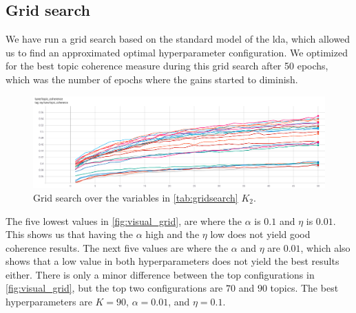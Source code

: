 \subsection{Grid search}
We have run a grid search based on the standard model of the \gls{lda}, which allowed us to find an approximated optimal hyperparameter configuration.
We optimized for the best topic coherence measure during this grid search after 50 epochs, which was the number of epochs where the gains started to diminish.
\begin{figure}
	\includegraphics[width=\textwidth]{figures/gridsearch.png}
	\caption{Grid search over the variables in \autoref{tab:gridsearch} $K_2$.}
	\label{fig:visual_grid}
\end{figure} 
The five lowest values in \autoref{fig:visual_grid}, are where the $\alpha$ is $0.1$ and $\eta$ is $0.01$. 
This shows us that having the $\alpha$ high and the $\eta$ low does not yield good coherence results.
The next five values are where the $\alpha$ and $\eta$ are $0.01$, which also shows that a low value in both hyperparameters does not yield the best results either.
There is only a minor difference between the top configurations in \autoref{fig:visual_grid}, but the top two configurations are $70$ and $90$ topics.
The best hyperparameters are $K = 90$, $\alpha = 0.01$, and $\eta = 0.1$.
